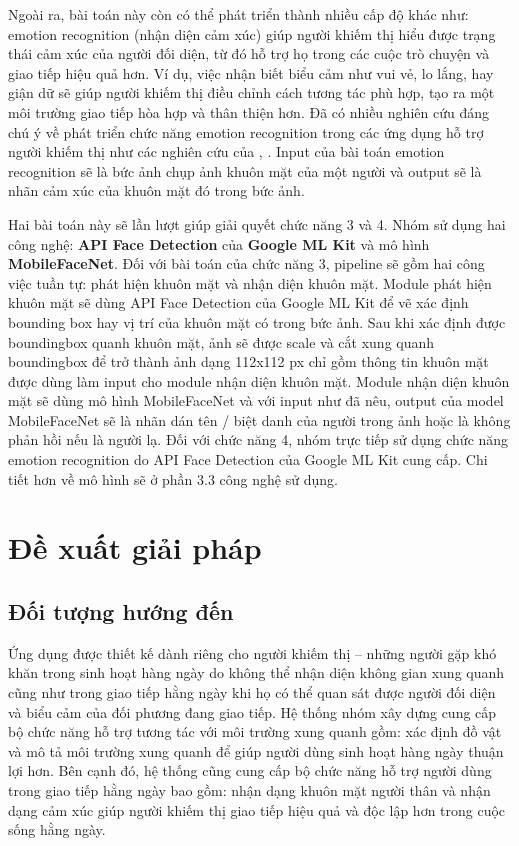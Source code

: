 \documentclass[a4paper,12pt]{article}
\begin{document}
Ngoài ra, bài toán này còn có thể phát triển thành nhiều cấp độ khác như: emotion recognition (nhận diện cảm xúc) giúp người khiếm thị hiểu được trạng thái cảm xúc của người đối diện, từ đó hỗ trợ họ trong các cuộc trò chuyện và giao tiếp hiệu quả hơn. Ví dụ, việc nhận biết biểu cảm như vui vẻ, lo lắng, hay giận dữ sẽ giúp người khiếm thị điều chỉnh cách tương tác phù hợp, tạo ra một môi trường giao tiếp hòa hợp và thân thiện hơn. Đã có nhiều nghiên cứu đáng chú ý về phát triển chức năng emotion recognition trong các ứng dụng hỗ trợ người khiếm thị như các nghiên cứu của \cite{akhand2021facial}, \cite{lutfallah2022emotion}. Input của bài toán emotion recognition sẽ là bức ảnh chụp ảnh khuôn mặt của một người và output sẽ là nhãn cảm xúc của khuôn mặt đó trong bức ảnh.

Hai bài toán này sẽ lần lượt giúp giải quyết chức năng 3 và 4. Nhóm sử dụng hai công nghệ: \textbf{API Face Detection} của \textbf{Google ML Kit} và mô hình \textbf{MobileFaceNet}.  Đối với bài toán của chức năng 3, pipeline sẽ gồm hai công việc tuần tự: phát hiện khuôn mặt và nhận diện khuôn mặt. Module phát hiện khuôn mặt sẽ dùng API Face Detection của Google ML Kit để vẽ xác định bounding box hay vị trí của khuôn mặt có trong bức ảnh. Sau khi xác định được boundingbox quanh khuôn mặt, ảnh sẽ được scale và cắt xung quanh boundingbox để trở thành ảnh dạng 112x112 px chỉ gồm thông tin khuôn mặt được dùng làm input cho module nhận diện khuôn mặt. Module nhận diện khuôn mặt sẽ dùng mô hình MobileFaceNet và với input như đã nêu, output của model MobileFaceNet sẽ là nhãn dán tên / biệt danh của người trong ảnh hoặc là không phản hồi nếu là người lạ. Đối với chức năng 4, nhóm trực tiếp sử dụng chức năng emotion recognition do API Face Detection của Google ML Kit cung cấp. Chi tiết hơn về mô hình sẽ ở phần 3.3 công nghệ sử dụng.


\section{Đề xuất giải pháp}
\subsection{Đối tượng hướng đến}
Ứng dụng được thiết kế dành riêng cho người khiếm thị – những người gặp khó khăn trong sinh hoạt hàng ngày do không thể nhận diện không gian xung quanh cũng như trong giao tiếp hằng ngày khi họ có thể quan sát được người đối diện và biểu cảm của đối phương đang giao tiếp. Hệ thống nhóm xây dựng cung cấp bộ chức năng hỗ trợ tương tác với môi trường xung quanh gồm: xác định đồ vật và mô tả môi trường xung quanh để giúp người dùng sinh hoạt hàng ngày thuận lợi hơn. Bên cạnh đó, hệ thống cũng cung cấp bộ chức năng hỗ trợ người dùng trong giao tiếp hằng ngày bao gồm: nhận dạng khuôn mặt người thân và nhận dạng cảm xúc giúp người khiếm thị giao tiếp hiệu quả và độc lập hơn trong cuộc sống hằng ngày.
\end{document}
